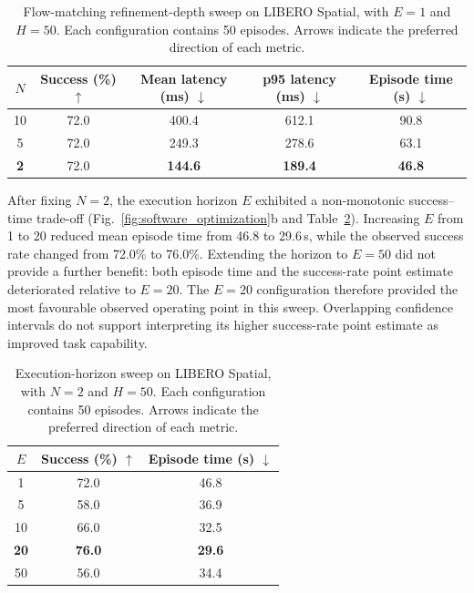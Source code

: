\begin{table}
  \centering
  \caption{Flow-matching refinement-depth sweep on LIBERO Spatial, with \(E=1\)
  and \(H=50\). Each configuration contains 50 episodes. Arrows indicate the
  preferred direction of each metric.}
  \label{tab:pc_refinement_depth}
  \small
  \setlength{\tabcolsep}{4pt}
  \begin{tabular}{@{}ccccc@{}}
    \toprule
    \(N\) & Success (\%) \(\uparrow\) &
    \shortstack{Mean latency\\(ms) \(\downarrow\)} &
    \shortstack{p95 latency\\(ms) \(\downarrow\)} &
    \shortstack{Episode time\\(s) \(\downarrow\)} \\
    \midrule
    10 & 72.0 & 400.4 & 612.1 & 90.8 \\
    5  & 72.0 & 249.3 & 278.6 & 63.1 \\
    \textbf{2} & 72.0 & \textbf{144.6} & \textbf{189.4} &
    \textbf{46.8} \\
    \bottomrule
  \end{tabular}
\end{table}

After fixing \(N=2\), the execution horizon \(E\) exhibited a non-monotonic
success--time trade-off (Fig.~\ref{fig:software_optimization}b and
Table~\ref{tab:pc_execution_horizon}). Increasing \(E\) from 1 to 20 reduced
mean episode time from 46.8 to 29.6\,s, while the observed success rate changed
from 72.0\% to 76.0\%. Extending the horizon to \(E=50\) did not provide a further
benefit: both episode time and the success-rate point estimate deteriorated
relative to \(E=20\). The \(E=20\) configuration therefore provided the most
favourable observed operating point in this sweep. Overlapping confidence
intervals do not support interpreting its higher success-rate point estimate as
improved task capability.

\begin{table}
  \centering
  \caption{Execution-horizon sweep on LIBERO Spatial, with \(N=2\) and \(H=50\).
  Each configuration contains 50 episodes. Arrows indicate the preferred
  direction of each metric.}
  \label{tab:pc_execution_horizon}
  \small
  \begin{tabular}{@{}ccc@{}}
    \toprule
    \(E\) & Success (\%) \(\uparrow\) & Episode time (s) \(\downarrow\) \\
    \midrule
    1  & 72.0 & 46.8 \\
    5  & 58.0 & 36.9 \\
    10 & 66.0 & 32.5 \\
    \textbf{20} & \textbf{76.0} & \textbf{29.6} \\
    50 & 56.0 & 34.4 \\
    \bottomrule
  \end{tabular}
\end{table}

